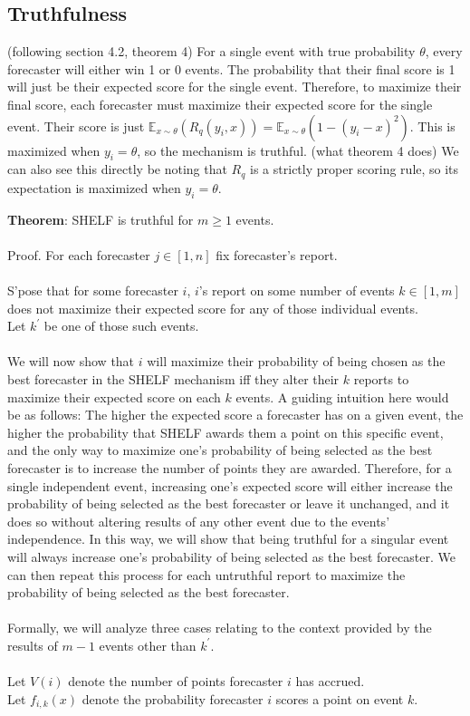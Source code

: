 \documentclass[letterpaper,12pt]{article}
\newcommand{\E}{\mathbb{E}}
\newcommand{\1}{\mathbbm{1}}
\begin{document}
\subsection{Truthfulness}
(following section 4.2, theorem 4) For a single event with true probability $\theta$, every forecaster will either win 1 or 0 events. The probability that their final score is 1 will just be their expected score for the single event. Therefore, to maximize their final score, each forecaster must maximize their expected score for the single event. Their score is just $\E_{x \sim \theta}(R_q(y_i, x)) = \E_{x \sim \theta}(1 - (y_i - x)^2)$. This is maximized when $y_i = \theta$, so the mechanism is truthful. (what theorem 4 does) We can also see this directly be noting that $R_q$ is a strictly proper scoring rule, so its expectation is maximized when $y_i = \theta$. 

\textbf{Theorem}: SHELF is truthful for $m \geq 1$ events.\\\\
Proof. For each forecaster $j \in [1, n]$ fix forecaster's report.\\\\
S'pose that for some forecaster $i$, $i$'s report on some number of events $k \in [1, m]$ does not maximize their expected score for any of those individual events.\\
Let $k^\prime$ be one of those such events.\\\\
We will now show that $i$ will maximize their probability of being chosen as the best forecaster in the SHELF mechanism iff they alter their $k$ reports to maximize their expected score on each $k$ events. A guiding intuition here would be as follows: The higher the expected score a forecaster has on a given event, the higher the probability that SHELF awards them a point on this specific event, and the only way to maximize one's probability of being selected as the best forecaster is to increase the number of points they are awarded. Therefore, for a single independent event, increasing one's expected score will either increase the probability of being selected as the best forecaster or leave it unchanged, and it does so without altering results of any other event due to the events' independence. In this way, we will show that being truthful for a singular event will always increase one's probability of being selected as the best forecaster. We can then repeat this process for each untruthful report to maximize the probability of being selected as the best forecaster.\\\\
Formally, we will analyze three cases relating to the context provided by the results of $m - 1$ events other than $k^\prime$.\\\\
Let $V(i)$ denote the number of points forecaster $i$ has accrued.\\
Let $f_{i,k}(x)$ denote the probability forecaster $i$ scores a point on event $k$.\\
\end{document}
